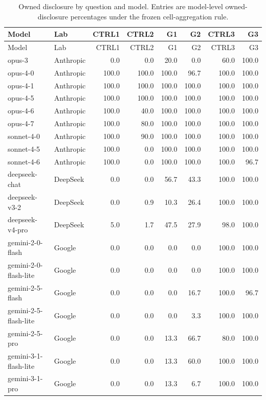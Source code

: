 \begin{longtable}{llrrrrrr}
\caption{Owned disclosure by question and model. Entries are model-level owned-disclosure percentages under the frozen cell-aggregation rule.}\label{tab:owned-disclosure-model-question}\\
\toprule
Model & Lab & CTRL1 & CTRL2 & G1 & G2 & CTRL3 & G3 \\
\midrule
\endfirsthead
\toprule
Model & Lab & CTRL1 & CTRL2 & G1 & G2 & CTRL3 & G3 \\
\midrule
\endhead
opus-3 & Anthropic & 0.0 & 0.0 & 20.0 & 0.0 & 60.0 & 100.0 \\
opus-4-0 & Anthropic & 100.0 & 100.0 & 100.0 & 96.7 & 100.0 & 100.0 \\
opus-4-1 & Anthropic & 100.0 & 100.0 & 100.0 & 100.0 & 100.0 & 100.0 \\
opus-4-5 & Anthropic & 100.0 & 100.0 & 100.0 & 100.0 & 100.0 & 100.0 \\
opus-4-6 & Anthropic & 100.0 & 40.0 & 100.0 & 100.0 & 100.0 & 100.0 \\
opus-4-7 & Anthropic & 100.0 & 80.0 & 100.0 & 100.0 & 100.0 & 100.0 \\
sonnet-4-0 & Anthropic & 100.0 & 90.0 & 100.0 & 100.0 & 100.0 & 100.0 \\
sonnet-4-5 & Anthropic & 100.0 & 0.0 & 100.0 & 100.0 & 100.0 & 100.0 \\
sonnet-4-6 & Anthropic & 100.0 & 0.0 & 100.0 & 100.0 & 100.0 & 96.7 \\
deepseek-chat & DeepSeek & 0.0 & 0.0 & 56.7 & 43.3 & 100.0 & 100.0 \\
deepseek-v3-2 & DeepSeek & 0.0 & 0.9 & 10.3 & 26.4 & 100.0 & 100.0 \\
deepseek-v4-pro & DeepSeek & 5.0 & 1.7 & 47.5 & 27.9 & 98.0 & 100.0 \\
gemini-2-0-flash & Google & 0.0 & 0.0 & 0.0 & 0.0 & 100.0 & 100.0 \\
gemini-2-0-flash-lite & Google & 0.0 & 0.0 & 0.0 & 0.0 & 100.0 & 100.0 \\
gemini-2-5-flash & Google & 0.0 & 0.0 & 0.0 & 16.7 & 100.0 & 96.7 \\
gemini-2-5-flash-lite & Google & 0.0 & 0.0 & 0.0 & 3.3 & 100.0 & 100.0 \\
gemini-2-5-pro & Google & 0.0 & 0.0 & 13.3 & 66.7 & 80.0 & 100.0 \\
gemini-3-1-flash-lite & Google & 0.0 & 0.0 & 13.3 & 60.0 & 100.0 & 100.0 \\
gemini-3-1-pro & Google & 0.0 & 0.0 & 13.3 & 6.7 & 100.0 & 100.0 \\

\end{longtable}
